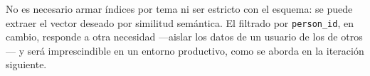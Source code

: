 No es necesario armar índices por tema ni ser estricto con el esquema: se puede extraer el vector deseado por similitud semántica. El filtrado por \texttt{person\_id}, en cambio, responde a otra necesidad —aislar los datos de un usuario de los de otros— y será imprescindible en un entorno productivo, como se aborda en la iteración siguiente.